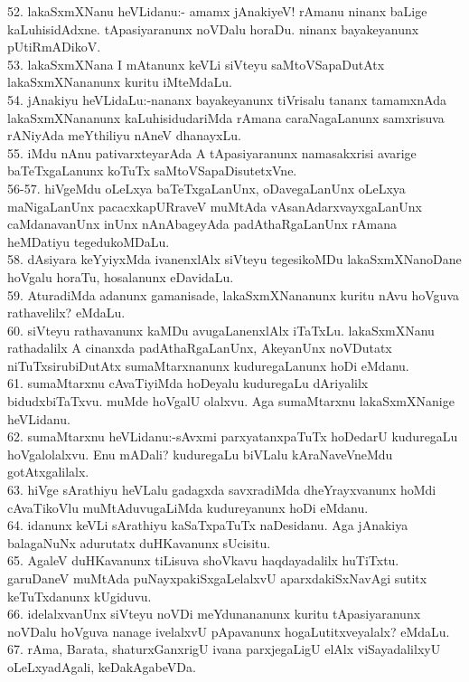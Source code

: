 \documentclass{article}
\begin{document}
52. lakaSxmXNanu heVLidanu:- amamx jAnakiyeV! rAmanu ninanx baLige kaLuhisidAdxne. tApasiyaranunx noVDalu horaDu. ninanx bayakeyanunx pUtiRmADikoV.\\
53. lakaSxmXNana I mAtanunx keVLi siVteyu saMtoVSapaDutAtx lakaSxmXNananunx kuritu iMteMdaLu.\\
54. jAnakiyu heVLidaLu:-nananx bayakeyanunx tiVrisalu tananx tamamxnAda lakaSxmXNananunx kaLuhisidudariMda rAmana caraNagaLanunx samxrisuva rANiyAda meYthiliyu nAneV dhanayxLu.\\
55. iMdu nAnu pativarxteyarAda A tApasiyaranunx namasakxrisi avarige baTeTxgaLanunx koTuTx saMtoVSapaDisutetxVne.\\
56-57. hiVgeMdu oLeLxya baTeTxgaLanUnx, oDavegaLanUnx oLeLxya maNigaLanUnx pacacxkapURraveV muMtAda vAsanAdarxvayxgaLanUnx caMdanavanUnx inUnx nAnAbageyAda padAthaRgaLanUnx rAmana heMDatiyu tegedukoMDaLu.\\
58. dAsiyara keYyiyxMda ivanenxlAlx siVteyu tegesikoMDu lakaSxmXNanoDane hoVgalu horaTu, hosalanunx eDavidaLu.\\
59. AturadiMda adanunx gamanisade, lakaSxmXNananunx kuritu nAvu hoVguva rathavelilx? eMdaLu.\\
60. siVteyu rathavanunx kaMDu avugaLanenxlAlx iTaTxLu. lakaSxmXNanu rathadalilx A cinanxda padAthaRgaLanUnx, AkeyanUnx noVDutatx niTuTxsirubiDutAtx sumaMtarxnanunx kuduregaLanunx hoDi eMdanu.\\
61. sumaMtarxnu cAvaTiyiMda hoDeyalu kuduregaLu dAriyalilx bidudxbiTaTxvu. muMde hoVgalU olalxvu. Aga sumaMtarxnu lakaSxmXNanige heVLidanu.\\
62. sumaMtarxnu heVLidanu:-sAvxmi parxyatanxpaTuTx hoDedarU kuduregaLu hoVgalolalxvu. Enu mADali? kuduregaLu biVLalu kAraNaveVneMdu gotAtxgalilalx.\\
63. hiVge sArathiyu heVLalu gadagxda savxradiMda dheYrayxvanunx hoMdi cAvaTikoVlu muMtAduvugaLiMda kudureyanunx hoDi eMdanu.\\
64. idanunx keVLi sArathiyu kaSaTxpaTuTx naDesidanu. Aga jAnakiya balagaNuNx adurutatx duHKavanunx sUcisitu.\\
65. AgaleV duHKavanunx tiLisuva shoVkavu haqdayadalilx huTiTxtu. garuDaneV muMtAda puNayxpakiSxgaLelalxvU aparxdakiSxNavAgi sutitx keTuTxdanunx kUgiduvu.\\
66. idelalxvanUnx siVteyu noVDi meYdunananunx kuritu tApasiyaranunx noVDalu hoVguva nanage ivelalxvU pApavanunx hogaLutitxveyalalx? eMdaLu.\\
67. rAma, Barata, shaturxGanxrigU ivana parxjegaLigU elAlx viSayadalilxyU oLeLxyadAgali, keDakAgabeVDa.\\
\end{document}
